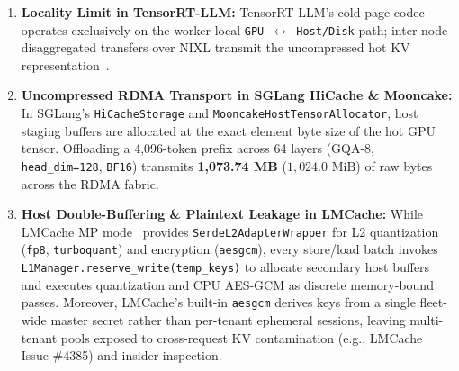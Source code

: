 \documentclass[10pt,twocolumn]{article}
\begin{document}
\begin{enumerate}
    \item \textbf{Locality Limit in TensorRT-LLM:} TensorRT-LLM's cold-page codec operates exclusively on the worker-local \texttt{GPU $\leftrightarrow$ Host/Disk} path; inter-node disaggregated transfers over NIXL transmit the uncompressed hot KV representation~\cite{nvidia2026trtllmcoldpage}.
    \item \textbf{Uncompressed RDMA Transport in SGLang HiCache \& Mooncake:} In SGLang's \texttt{HiCacheStorage} and \texttt{MooncakeHostTensorAllocator}, host staging buffers are allocated at the exact element byte size of the hot GPU tensor. Offloading a 4,096-token prefix across 64 layers (GQA-8, \texttt{head\_dim=128}, \texttt{BF16}) transmits \textbf{1,073.74 MB} ($1,024.0\text{ MiB}$) of raw bytes across the RDMA fabric.
    \item \textbf{Host Double-Buffering \& Plaintext Leakage in LMCache:} While LMCache MP mode~\cite{cheng2025lmcache} provides \texttt{SerdeL2AdapterWrapper} for L2 quantization (\texttt{fp8}, \texttt{turboquant}) and encryption (\texttt{aesgcm}), every store/load batch invokes \texttt{L1Manager.reserve\_write(temp\_keys)} to allocate secondary host buffers and executes quantization and CPU AES-GCM as discrete memory-bound passes. Moreover, LMCache's built-in \texttt{aesgcm} derives keys from a single fleet-wide master secret rather than per-tenant ephemeral sessions, leaving multi-tenant pools exposed to cross-request KV contamination (e.g., LMCache Issue \#4385) and insider inspection.
\end{enumerate}
\end{document}
